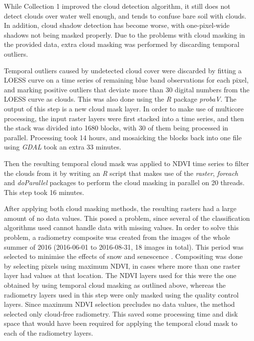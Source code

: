 \documentclass[a4paper,10pt]{book}
\begin{document}
While Collection 1 improved the cloud detection algorithm, it still does not detect clouds over water well enough, and tends to confuse bare soil with clouds. In addition, cloud shadow detection has become worse, with one-pixel-wide shadows not being masked properly. Due to the problems with cloud masking in the provided data, extra cloud masking was performed by discarding temporal outliers.

Temporal outliers caused by undetected cloud cover were discarded by fitting a LOESS curve on a time series of remaining blue band observations for each pixel, and marking positive outliers that deviate more than 30 digital numbers from the LOESS curve as clouds. This was also done using the \textit{R} package \textit{probaV}. The output of this step is a new cloud mask layer. In order to make use of multicore processing, the input raster layers were first stacked into a time series, and then the stack was divided into 1680 blocks, with 30 of them being processed in parallel. Processing took 14 hours, and mosaicking the blocks back into one file using \textit{GDAL} took an extra 33 minutes.

Then the resulting temporal cloud mask was applied to NDVI time series to filter the clouds from it by writing an \textit{R} script that makes use of the \textit{raster}, \textit{foreach} and \textit{doParallel} packages to perform the cloud masking in parallel on 20 threads. This step took 16 minutes.

After applying both cloud masking methods, the resulting rasters had a large amount of no data values. This posed a problem, since several of the classification algorithms used cannot handle data with missing values. In order to solve this problem, a radiometry composite was created from the images of the whole summer of 2016 (2016-06-01 to 2016-08-31, 18 images in total). This period was selected to minimise the effects of snow and senescence \citep{bartalev2014probavboreal}. Compositing was done by selecting pixels using maximum NDVI, in cases where more than one raster layer had values at that location. The NDVI layers used for this were the one obtained by using temporal cloud masking as outlined above, whereas the radiometry layers used in this step were only masked using the quality control layers. Since maximum NDVI selection precludes no data values, the method selected only cloud-free radiometry. This saved some processing time and disk space that would have been required for applying the temporal cloud mask to each of the radiometry layers.
\end{document}
